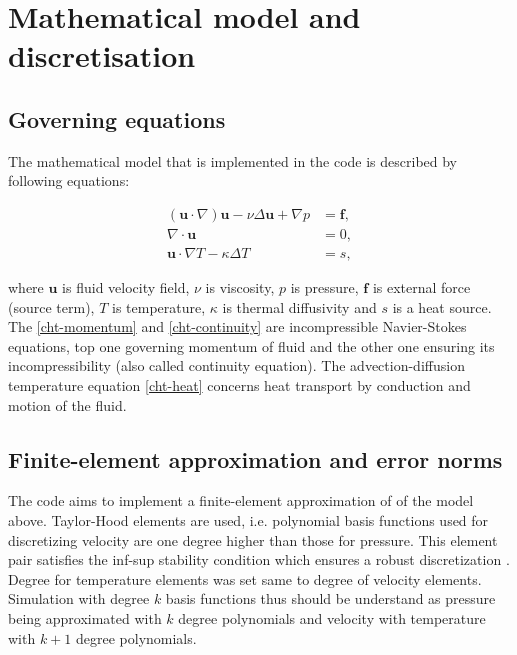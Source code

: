 \documentclass[11pt,a4paper]{article}
\begin{document}
\section{Mathematical model and discretisation}
\subsection{Governing equations}

The mathematical model that is implemented in the code is described by following equations:

\begin{subequations}\label{cht}
  \begin{align}
    (\bm{u}\cdot\nabla)\bm{u}-\nu\Delta\bm{u}+\nabla p &= \bm{f}, \label{cht-momentum}\\
    \nabla\cdot\bm{u} &= 0, \label{cht-continuity} \\
    \bm{u}\cdot\nabla T-\kappa\Delta T &= s, \label{cht-heat}
  \end{align}
\end{subequations}  


where $\bm{u}$ is fluid velocity field, $\nu$ is viscosity, $p$ is pressure, $\bm{f}$ is external force (source term), $T$ is temperature, $\kappa$ is thermal diffusivity and $s$ is a heat source.
The \eqref{cht-momentum} and \eqref{cht-continuity} are incompressible Navier-Stokes equations, top one governing momentum of fluid and the other one ensuring its incompressibility (also called continuity equation).
The advection-diffusion temperature equation \ref{cht-heat} concerns heat transport by conduction and motion of the fluid.  



\subsection{Finite-element approximation and error norms}
The code aims to implement a finite-element approximation of of the model above.
Taylor-Hood elements are used, i.e. polynomial basis functions used for discretizing velocity are one degree higher than those for pressure.
This element pair satisfies the inf-sup stability condition which ensures a robust discretization \cite{taylor1973numerical,brezzi1991stability}.
Degree for temperature elements was set same to degree of velocity elements.
Simulation with degree $k$ basis functions thus should be understand as pressure being approximated with $k$ degree polynomials and velocity with temperature with $k+1$ degree polynomials.
\end{document}
